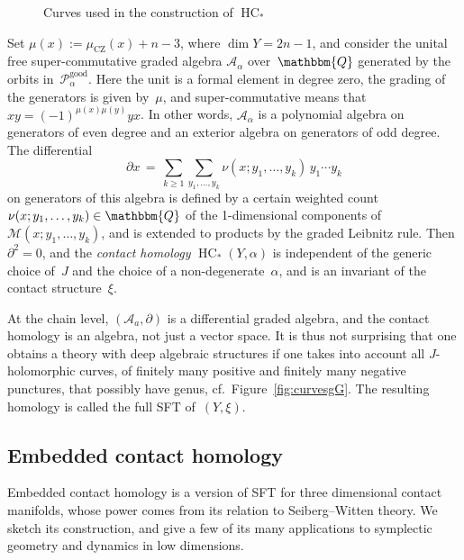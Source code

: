 \documentclass[12pt,twoside]{amsart}
\def\good{\operatorname{good}}
\theoremstyle{plain}
\numberwithin{figure}{section}
\numberwithin{equation}{section}
\def\sCZ{ {\scriptscriptstyle\operatorname{CZ}}}
\def\HC{\operatorname{HC}}
\def\ga{\alpha}
\def\ca{{\mathcal A}}
\def\cm{{\mathcal M}}
\def\cp{{\mathcal P}}
\def\QQ{\mathbbm{Q}}
\def\pp{\partial}
\begin{document}
%
%
%
\begin{figure}[ht] 
 \begin{center}
   \leavevmode{}
 \end{center}
 \caption{Curves used in the construction of $\HC_*$} 
 \label{fig.ch}
\end{figure}
%
%

Set $\mu (x) := \mu_{\sCZ} (x)+n-3$, where $\dim Y = 2n-1$,
and consider the unital free super-commutative graded algebra $\ca_\ga$ over~$\QQ$
generated by the orbits in~$\cp_\ga^{\good}$.
Here the unit is a formal element in degree zero, 
the grading of the generators is given by~$\mu$, 
and super-commutative means that $xy = (-1)^{\mu(x) \mu(y)} yx$.
In other words, $\ca_\ga$ is a polynomial algebra on generators of even degree
and an exterior algebra on generators of odd degree.
The differential 
$$
\pp x \,=\, \sum_{k \geqslant 1} \sum_{y_1, \dots, y_k} \nu (x;y_1, \dots, y_k) \, y_1 \cdots y_k
$$
on generators of this algebra is defined by a certain weighted count $\nu (x;y_1, \dots, y_k) \in \QQ$
of the 1-dimensional components of $\cm (x;y_1, \dots, y_k)$, 
and is extended to products by the graded Leibnitz rule.
%
Then $\pp^2 =0$, and the {\it contact homology}\/ $\HC_* (Y,\ga)$ is independent of 
the generic choice of~$J$ and the choice of a non-degenerate~$\ga$, 
and is an invariant of the contact structure~$\xi$.

At the chain level, $(\ca_a, \pp)$ is a differential graded algebra, 
and the contact homology is an algebra, not just a vector space. 
%
It is thus not surprising that one obtains a theory with deep algebraic structures
if one takes into account all $J$-holomorphic curves, of finitely many positive and finitely many
negative punctures, that possibly have genus, cf.\ Figure~\ref{fig:curvesgG}.
The resulting homology is called the full SFT of~$(Y,\xi)$.


\subsection{Embedded contact homology} \label{s:ech}

Embedded contact homology is a version of SFT for three dimensional contact manifolds,
whose power comes from its relation to Seiberg--Witten theory.
We sketch its construction, and give a few of its many applications to symplectic geometry and dynamics in low dimensions.
\end{document}

